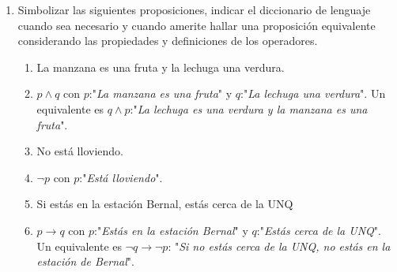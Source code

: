 \documentclass[a4paper]{article}
\newcommand{\answer}{\item[**]}
\newcommand{\exercise}{\item}
\newcommand{\then}{\to}
\begin{document}
\begin{enumerate}
\begin{multicols}{2}
\begin{enumerate} [label=(\alph*)]
		\item $x=6$ y $x+4=10$ 
		\answer Función informativa, es proposición. Aunque sean simbolos matemáticos, esta proposición se puede leer como "El número x es seis y el número x sumado a 4 es igual a 10". Lo que hace que esto sea una proposición es que estamos afirmando las igualdades, que el número es igual a 6 y que sumado a 4 es igual a 10. La proposición es V.

		\item $x+4$ 
		\answer No es proposición. Se puede leer como "El número $x$ más 4" y no se afirma nada al respecto. Es similar al inciso de "En las aulas de la UNQ".

		\item $x^2-4$ no tiene raíces reales 
		\answer Función afirmativa, es una proposición. Para averiguar su valor de verdad debemos buscar las raíces de la parábola, es decir, $x^2-4=0$. Mediante la fórmula de Bhaskara (la resolvente cuadrática) podemos obtener que $x=2$ o $x=-2$. $2$ y $-2$ son números reales. Por lo que la proposición es falsa. 

	\end{enumerate}
	\end{multicols}

	\exercise Simbolizar las siguientes proposiciones, indicar el diccionario de lenguaje cuando sea necesario y cuando amerite hallar una proposición equivalente considerando las propiedades y definiciones de los operadores.
	\begin{multicols}{2}
	\begin{enumerate} [label=(\alph*)]

		\item La manzana es una fruta y la lechuga una verdura. 
		\answer $p \land q$ con $p$:"\textit{La manzana es una fruta}" y $q$:"\textit{La lechuga una verdura}". Un equivalente es $q \land p$:"\textit{La lechuga es una verdura y la manzana es una fruta}".

		\item No está lloviendo. 
		\answer $\neg p$ con $p$:"\textit{Está lloviendo}".

		\item Si estás en la estación Bernal, estás cerca de la UNQ 
		\answer $p\then q$ con $p$:"\textit{Estás en la estación Bernal}" y $q$:"\textit{Estás cerca de la UNQ}". Un equivalente es $\neg q \then \neg p$: "\textit{Si no estás cerca de la UNQ, no estás en la estación de Bernal}".


\end{enumerate}
\end{multicols}
\end{enumerate}
\end{document}
